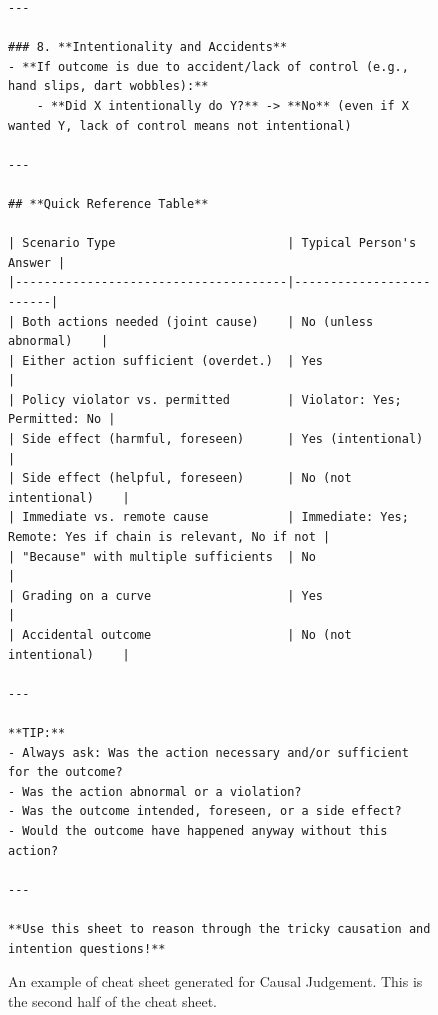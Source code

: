 \begin{figure}[t]
\begin{tcolorbox}[title=Cheat Sheet for Causal Judgement (2/2), colback=gray!10, colframe=black!70, boxrule=0.5pt, top=0pt, bottom=0pt, left=0pt, right=0pt, arc=0.8mm, width=1.0\textwidth]
\begin{lstlisting}
---

### 8. **Intentionality and Accidents**
- **If outcome is due to accident/lack of control (e.g., hand slips, dart wobbles):**
    - **Did X intentionally do Y?** -> **No** (even if X wanted Y, lack of control means not intentional)

---

## **Quick Reference Table**

| Scenario Type                        | Typical Person's Answer |
|--------------------------------------|-------------------------|
| Both actions needed (joint cause)    | No (unless abnormal)    |
| Either action sufficient (overdet.)  | Yes                     |
| Policy violator vs. permitted        | Violator: Yes; Permitted: No |
| Side effect (harmful, foreseen)      | Yes (intentional)       |
| Side effect (helpful, foreseen)      | No (not intentional)    |
| Immediate vs. remote cause           | Immediate: Yes; Remote: Yes if chain is relevant, No if not |
| "Because" with multiple sufficients  | No                      |
| Grading on a curve                   | Yes                     |
| Accidental outcome                   | No (not intentional)    |

---

**TIP:**  
- Always ask: Was the action necessary and/or sufficient for the outcome?  
- Was the action abnormal or a violation?  
- Was the outcome intended, foreseen, or a side effect?  
- Would the outcome have happened anyway without this action?

---

**Use this sheet to reason through the tricky causation and intention questions!**
\end{lstlisting}
\end{tcolorbox}
\caption{
An example of cheat sheet generated for Causal Judgement.
This is the second half of the cheat sheet.
}
\label{fig:cheat_sheet_causal_2}
\end{figure}